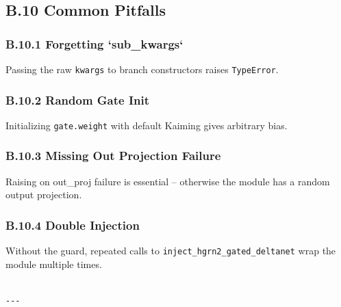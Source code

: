 \subsection{B.10 Common Pitfalls}

\subsubsection{B.10.1 Forgetting `sub\_kwargs`}

Passing the raw \texttt{kwargs} to branch constructors raises \texttt{TypeError}.

\subsubsection{B.10.2 Random Gate Init}

Initializing \texttt{gate.weight} with default Kaiming gives arbitrary bias.

\subsubsection{B.10.3 Missing Out Projection Failure}

Raising on out\_proj failure is essential -- otherwise the module has a 
random output projection.

\subsubsection{B.10.4 Double Injection}

Without the guard, repeated calls to \texttt{inject\_hgrn2\_gated\_deltanet} wrap the 
module multiple times.
\begin{lstlisting}

---
\end{lstlisting}